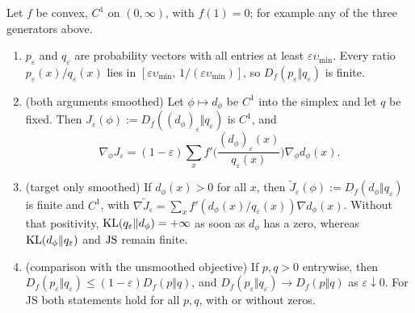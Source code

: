 \begin{proposition}\label{prop:div-smooth}
Let $f$ be convex, $C^1$ on $(0,\infty)$, with $f(1)=0$; for example any of the three generators above.
\begin{enumerate}[nosep,label=(\alph*)]
\item $p_\varepsilon$ and $q_\varepsilon$ are probability vectors with all entries at least $\varepsilon\upsilon_{\min}$.
  Every ratio $p_\varepsilon(x)/q_\varepsilon(x)$ lies in $[\varepsilon\upsilon_{\min},\,1/(\varepsilon\upsilon_{\min})]$, so $D_f(p_\varepsilon\Vert q_\varepsilon)$ is finite.
\item (both arguments smoothed) Let $\phi\mapsto d_\phi$ be $C^1$ into the simplex and let $q$ be fixed. Then $J_\varepsilon(\phi):=D_f((d_\phi)_\varepsilon\Vert q_\varepsilon)$ is $C^1$, and
\[
\nabla_\phi J_\varepsilon=(1-\varepsilon)\sum_{x}f'\!\Big(\frac{(d_\phi)_\varepsilon(x)}{q_\varepsilon(x)}\Big)\nabla_\phi d_\phi(x).
\]
\item (target only smoothed) If $d_\phi(x)>0$ for all $x$, then $\tilde J_\varepsilon(\phi):=D_f(d_\phi\Vert q_\varepsilon)$ is finite and $C^1$, with $\nabla\tilde J_\varepsilon=\sum_xf'(d_\phi(x)/q_\varepsilon(x))\nabla d_\phi(x)$.
  Without that positivity, $\mathrm{KL}(q_\varepsilon\Vert d_\phi)=+\infty$ as soon as $d_\phi$ has a zero, whereas $\mathrm{KL}(d_\phi\Vert q_\varepsilon)$ and $\mathrm{JS}$ remain finite.
\item (comparison with the unsmoothed objective) If $p,q>0$ entrywise, then $D_f(p_\varepsilon\Vert q_\varepsilon)\le(1-\varepsilon)D_f(p\Vert q)$, and $D_f(p_\varepsilon\Vert q_\varepsilon)\to D_f(p\Vert q)$ as $\varepsilon\downarrow0$.
  For JS both statements hold for all $p,q$, with or without zeros.
\end{enumerate}
\end{proposition}

